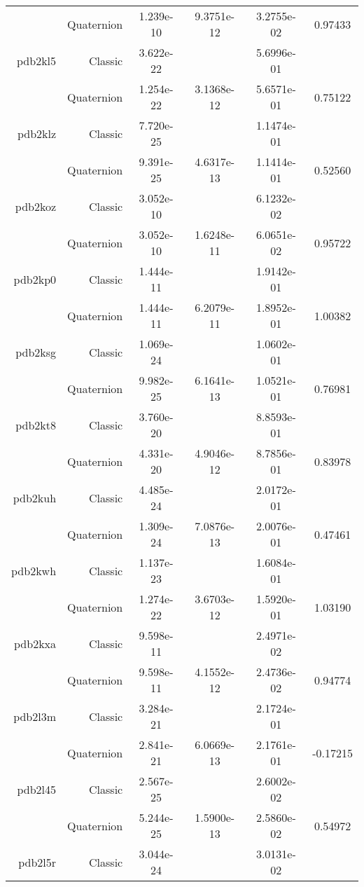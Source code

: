 \begin{xltabular}{\textwidth}{r|rS[table-format=1.3e+2]S[table-format=1.4e+2]S[table-format=1.4e+2]S[table-format=-1.5]}
& Quaternion & 1.239e-10 & 9.3751e-12 & 3.2755e-02 & 0.97433\\  \addlinespace
pdb2kl5 & Classic & 3.622e-22 &  & 5.6996e-01 & \\
& Quaternion & 1.254e-22 & 3.1368e-12 & 5.6571e-01 & 0.75122\\  \addlinespace
pdb2klz & Classic & 7.720e-25 &  & 1.1474e-01 & \\
& Quaternion & 9.391e-25 & 4.6317e-13 & 1.1414e-01 & 0.52560\\  \addlinespace
pdb2koz & Classic & 3.052e-10 &  & 6.1232e-02 & \\
& Quaternion & 3.052e-10 & 1.6248e-11 & 6.0651e-02 & 0.95722\\  \addlinespace
pdb2kp0 & Classic & 1.444e-11 &  & 1.9142e-01 & \\
& Quaternion & 1.444e-11 & 6.2079e-11 & 1.8952e-01 & 1.00382\\  \addlinespace
pdb2ksg & Classic & 1.069e-24 &  & 1.0602e-01 & \\
& Quaternion & 9.982e-25 & 6.1641e-13 & 1.0521e-01 & 0.76981\\  \addlinespace
pdb2kt8 & Classic & 3.760e-20 &  & 8.8593e-01 & \\
& Quaternion & 4.331e-20 & 4.9046e-12 & 8.7856e-01 & 0.83978\\  \addlinespace
pdb2kuh & Classic & 4.485e-24 &  & 2.0172e-01 & \\
& Quaternion & 1.309e-24 & 7.0876e-13 & 2.0076e-01 & 0.47461\\  \addlinespace
pdb2kwh & Classic & 1.137e-23 &  & 1.6084e-01 & \\
& Quaternion & 1.274e-22 & 3.6703e-12 & 1.5920e-01 & 1.03190\\  \addlinespace
pdb2kxa & Classic & 9.598e-11 &  & 2.4971e-02 & \\
& Quaternion & 9.598e-11 & 4.1552e-12 & 2.4736e-02 & 0.94774\\  \addlinespace
pdb2l3m & Classic & 3.284e-21 &  & 2.1724e-01 & \\
& Quaternion & 2.841e-21 & 6.0669e-13 & 2.1761e-01 & -0.17215\\  \addlinespace
pdb2l45 & Classic & 2.567e-25 &  & 2.6002e-02 & \\
& Quaternion & 5.244e-25 & 1.5900e-13 & 2.5860e-02 & 0.54972\\  \addlinespace
pdb2l5r & Classic & 3.044e-24 &  & 3.0131e-02 & \\

\end{xltabular}
